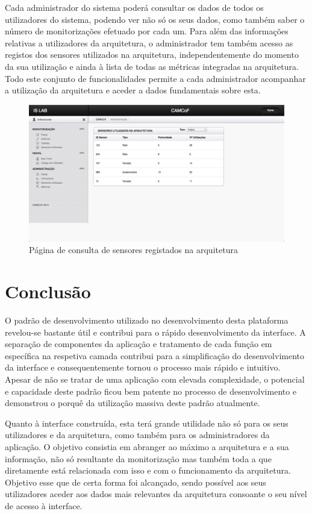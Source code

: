 Cada administrador do sistema poderá consultar os dados de todos os utilizadores do sistema, podendo ver não só os seus dados, como também saber o número de monitorizações efetuado por cada um. Para além das informações relativas a utilizadores da arquitetura, o administrador tem também acesso as registos dos sensores utilizados na arquitetura, independentemente do momento da sua utilização e ainda à lista de todas as métricas integradas na arquitetura. Todo este conjunto de funcionalidades permite a cada administrador acompanhar a utilização da arquitetura e aceder a dados fundamentais sobre esta.

\begin{figure}[htb]
   \centering
   \includegraphics[scale=0.29]{Images/sensores.png}
   \caption{Página de consulta de sensores registados na arquitetura}
\end{figure}


\section{Conclusão}

O padrão de desenvolvimento utilizado no desenvolvimento desta plataforma revelou-se bastante útil e contribui para o rápido desenvolvimento da interface. A separação de componentes da aplicação e tratamento de cada função em específica na respetiva camada contribui para a simplificação do desenvolvimento da interface e consequentemente tornou o processo mais rápido e intuitivo. Apesar de não se tratar de uma aplicação com elevada complexidade, o potencial e capacidade deste padrão ficou bem patente no processo de desenvolvimento e demonstrou o porquê da utilização massiva deste padrão atualmente.

Quanto à interface construída, esta terá grande utilidade não só para os seus utilizadores e da arquitetura, como também para os administradores da aplicação. O objetivo consistia em abranger ao máximo a arquitetura e a sua informação, não só resultante da monitorização mas também toda a que diretamente está relacionada com isso e com o funcionamento da arquitetura.  Objetivo esse que de certa forma foi alcançado, sendo possível aos seus utilizadores aceder aos dados mais relevantes da arquitetura consoante o seu nível de acesso à interface.

